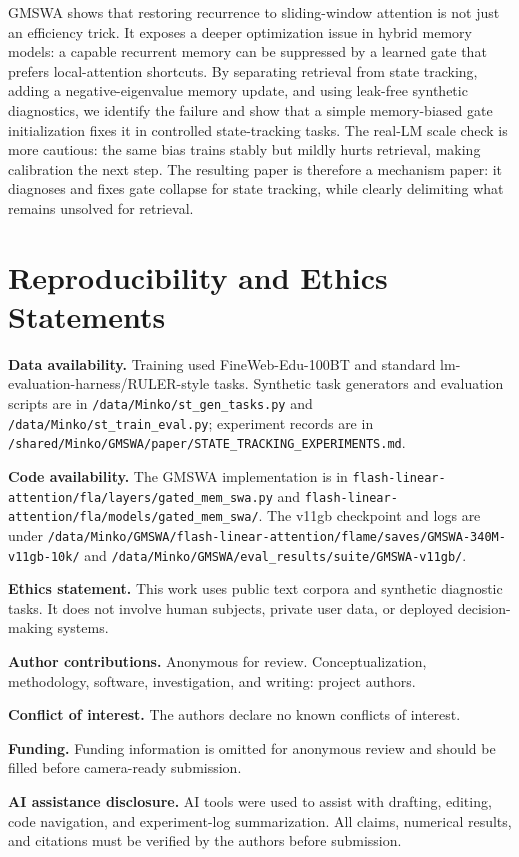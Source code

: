 \documentclass[letterpaper]{article}
\begin{document}
GMSWA shows that restoring recurrence to sliding-window attention is not just an efficiency trick. It exposes a deeper optimization issue in hybrid memory models: a capable recurrent memory can be suppressed by a learned gate that prefers local-attention shortcuts. By separating retrieval from state tracking, adding a negative-eigenvalue memory update, and using leak-free synthetic diagnostics, we identify the failure and show that a simple memory-biased gate initialization fixes it in controlled state-tracking tasks. The real-LM scale check is more cautious: the same bias trains stably but mildly hurts retrieval, making calibration the next step. The resulting paper is therefore a mechanism paper: it diagnoses and fixes gate collapse for state tracking, while clearly delimiting what remains unsolved for retrieval.

\section*{Reproducibility and Ethics Statements}

\textbf{Data availability.} Training used FineWeb-Edu-100BT and standard lm-evaluation-harness/RULER-style tasks. Synthetic task generators and evaluation scripts are in \texttt{/data/Minko/st\_gen\_tasks.py} and \texttt{/data/Minko/st\_train\_eval.py}; experiment records are in \texttt{/shared/Minko/GMSWA/paper/STATE\_TRACKING\_EXPERIMENTS.md}.

\textbf{Code availability.} The GMSWA implementation is in \texttt{flash-linear-attention/fla/layers/gated\_mem\_swa.py} and \texttt{flash-linear-attention/fla/models/gated\_mem\_swa/}. The v11gb checkpoint and logs are under \texttt{/data/Minko/GMSWA/flash-linear-attention/flame/saves/GMSWA-340M-v11gb-10k/} and \texttt{/data/Minko/GMSWA/eval\_results/suite/GMSWA-v11gb/}.

\textbf{Ethics statement.} This work uses public text corpora and synthetic diagnostic tasks. It does not involve human subjects, private user data, or deployed decision-making systems.

\textbf{Author contributions.} Anonymous for review. Conceptualization, methodology, software, investigation, and writing: project authors.

\textbf{Conflict of interest.} The authors declare no known conflicts of interest.

\textbf{Funding.} Funding information is omitted for anonymous review and should be filled before camera-ready submission.

\textbf{AI assistance disclosure.} AI tools were used to assist with drafting, editing, code navigation, and experiment-log summarization. All claims, numerical results, and citations must be verified by the authors before submission.



\end{document}
